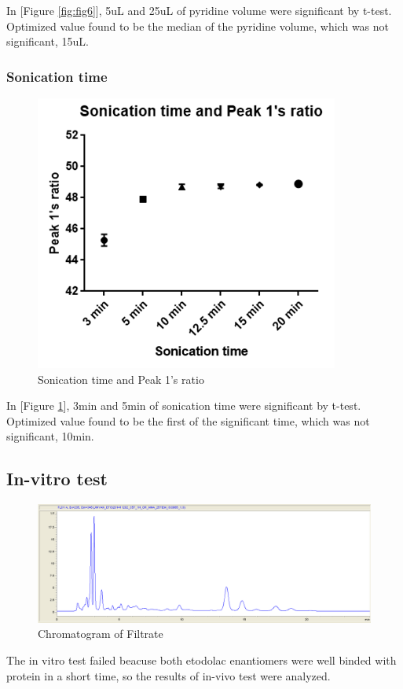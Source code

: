 \documentclass[12pt]{article} %
\begin{document}
 In [Figure \ref{fig:fig6}],  5uL and 25uL of pyridine volume were significant by t-test. Optimized value found to be the median of the pyridine volume, which was not significant, 15uL.

\subsubsection {Sonication time}

\begin{figure}[h!]
  \centering
  \includegraphics[width=0.6\linewidth]{fig7.png}
  \caption{Sonication time and Peak 1's ratio}
  \label{fig:fig7}
\end{figure}
  In [Figure \ref{fig:fig7}],  3min and 5min of sonication time were significant by t-test. Optimized value found to be the first of the significant time, which was not significant, 10min.



\subsection {In-vitro test}
\begin{figure}[h!]
  \centering
  \includegraphics[width=\linewidth]{f9.png}
  \caption{Chromatogram of Filtrate}
  \label{fig:fig9}
\end{figure}
 The in vitro test failed beacuse both etodolac enantiomers were well binded with protein in a short time, so the results of in-vivo test were analyzed.
\end{document}
